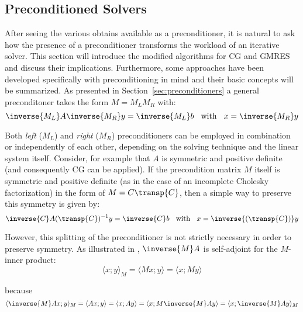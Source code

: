 \subsection{Preconditioned Solvers}
\label{sec:preconditioned_methods}

After seeing the various obtains available as a preconditioner, it is natural to ask how the presence of a preconditioner transforms the workload of an iterative solver. This section will introduce the modified algorithms for CG and GMRES and discuss their implications. Furthermore, some approaches have been developed specifically with preconditioning in mind and their basic concepts will be summarized. As presented in Section~\hyperref[sec:preconditioners]{\ref{sec:preconditioners}} a general preconditoner takes the form $M=M_LM_R$ with:
\begin{equation}
    \inverse{M_L}A\inverse{M_R}y = \inverse{M_L}b\;\; \text{ with }\;\; x=\inverse{M_R}y
\end{equation}

\noindent Both \textit{left} ($M_L$) and \textit{right} ($M_R$) preconditioners can be employed in combination or independently of each other, depending on the solving technique and the linear system itself. Consider, for example that $A$ is symmetric and positive definite (and consequently CG can be applied). If the precondition matrix $M$ itself is symmetric and positive definite (as in the case of an incomplete Cholesky factorization) in the form of $M=C\transp{C}$, then a simple way to preserve this symmetry is given by:
\begin{equation}
    \inverse{C}A(\transp{C})^{-1}y = \inverse{C}b\;\; \text{ with }\;\; x=\inverse{(\transp{C})}y
\end{equation}

\noindent However, this splitting of the preconditioner is not strictly necessary in order to preserve symmetry. As illustrated in \cite{saad_iterative_2003}, $\inverse{M}A$ is self-adjoint for the $M$-inner product:
\begin{equation}
    \langle x;y \rangle_M = \langle Mx;y \rangle = \langle x;My \rangle
\end{equation}

\noindent because
\begin{equation}
    \langle \inverse{M}Ax;y \rangle_M = \langle Ax;y \rangle = \langle x;Ay \rangle=\langle x;M\inverse{M}Ay \rangle = \langle x;\inverse{M}Ay \rangle_M
\end{equation}

